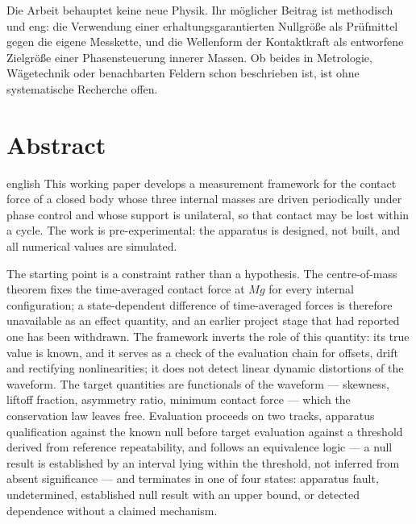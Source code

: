 \documentclass[12pt,a4paper]{report}
\begin{document}
Die Arbeit behauptet keine neue Physik. Ihr möglicher Beitrag ist
methodisch und eng: die Verwendung einer erhaltungsgarantierten Nullgröße
als Prüfmittel gegen die eigene Messkette, und die Wellenform der
Kontaktkraft als entworfene Zielgröße einer Phasensteuerung innerer
Massen. Ob beides in Metrologie, Wägetechnik oder benachbarten Feldern
schon beschrieben ist, ist ohne systematische Recherche offen.

\clearpage

\chapter*{Abstract}

\begin{otherlanguage*}{english}
This working paper develops a measurement framework for the contact force of a
closed body whose three internal masses are driven periodically under
phase control and whose support is unilateral, so that contact may be
lost within a cycle. The work is pre-experimental: the apparatus is
designed, not built, and all numerical values are simulated.

The starting point is a constraint rather than a hypothesis. The
centre-of-mass theorem fixes the time-averaged contact force at $Mg$ for
every internal configuration; a state-dependent difference of
time-averaged forces is therefore unavailable as an effect quantity, and
an earlier project stage that had reported one has been withdrawn. The
framework inverts the role of this quantity: its true value is known,
and it serves as a check of the evaluation chain for offsets, drift and
rectifying nonlinearities; it does not detect linear dynamic distortions
of the waveform.
The target quantities are functionals of the waveform --- skewness,
liftoff fraction, asymmetry ratio, minimum contact force --- which the
conservation law leaves free. Evaluation proceeds on two tracks,
apparatus qualification against the known null before target evaluation
against a threshold derived from reference repeatability, and
follows an equivalence logic --- a null result is established by an
interval lying within the threshold, not inferred from absent
significance --- and terminates in one of four states: apparatus fault,
undetermined, established null result with an upper bound, or detected
dependence without a claimed mechanism.


\end{otherlanguage*}
\end{document}
